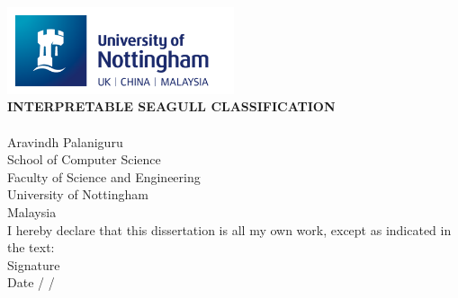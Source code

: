 \documentclass[a4paper,12pt]{article}
\begin{document}
\newpage
\begin{titlepage}
    \begin{center}
        \vspace{0.1em}
        \includegraphics[width=0.5\textwidth]{images/nottingham_logo.png}\\[6em]

        \textbf{INTERPRETABLE SEAGULL CLASSIFICATION}\\[6em]

        \\[4em]

        Aravindh Palaniguru\\
        School of Computer Science\\
        Faculty of Science and Engineering\\
        University of Nottingham\\
        Malaysia\\[6em]

        I hereby declare that this dissertation is all my own work, except as indicated in the text:\\[4em]

        Signature \underline{\hspace{7cm}}\\[2em]
        Date \hspace{1cm} \underline{\hspace{1cm}} / \underline{\hspace{1cm}} / \underline{\hspace{2cm}}
    \end{center}
\end{titlepage}



\end{document}
